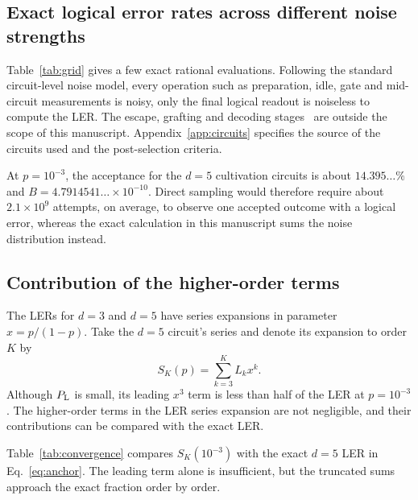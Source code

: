 \subsection{Exact logical error rates across different noise strengths}
Table~\ref{tab:grid} gives a few exact rational evaluations. Following the standard circuit-level noise model, every operation such as preparation, idle, gate and
mid-circuit measurements is noisy, only the final logical readout is noiseless to compute the LER. The escape, grafting and decoding stages~\cite{msc} are outside the scope of this manuscript. Appendix~\ref{app:circuits} specifies the source of the circuits used and the post-selection criteria.

\begin{table}[h]
\centering
\captionsetup{font=small,position=above,skip=4pt}
\caption{Whole-circuit $d=5$ results. Displayed decimals are rounded; the stored values are exact fractions.}
\label{tab:grid}
\footnotesize
\setlength{\tabcolsep}{3pt}

\end{table}

At $p=10^{-3}$, the acceptance for the $d=5$ cultivation circuits is about
$14.395\ldots\%$ and 
$B=4.7914541\ldots\times10^{-10}$. Direct sampling would therefore require about $2.1\times10^9$
attempts, on average, to observe one accepted outcome with a logical error, whereas the exact calculation in this manuscript sums the noise distribution instead.


\subsection{Contribution of the higher-order terms}
The LERs for $d=3$ and $d=5$ have series
expansions in parameter $x=p/(1-p)$. Take the $d=5$ circuit's series and denote
its expansion to order $K$ by
\begin{equation}
S_K(p)=\sum_{k=3}^{K}L_kx^k.
\end{equation}
Although $P_{\mathrm L}$ is small, its leading $x^3$ term is less than half of the LER at $p=10^{-3}$. The higher-order terms in the LER series expansion are not negligible, and their contributions can be compared with the exact LER.

Table~\ref{tab:convergence} compares $S_K(10^{-3})$ with the exact $d=5$ LER in Eq.~\eqref{eq:anchor}. The leading term alone is insufficient, but the truncated sums approach the exact fraction order by order.
\begin{table}[h]
\centering
\captionsetup{font=small,position=above,skip=4pt}
\caption{Truncated whole-circuit series at $p=10^{-3}$, compared with the exact rational value.}
\label{tab:convergence}
\footnotesize
\setlength{\tabcolsep}{3pt}

\end{table}


